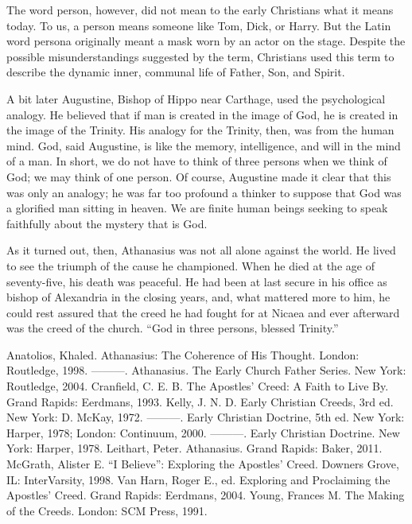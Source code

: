 The word person, however, did not mean to the early Christians what it means today. To us, a person
means someone like Tom, Dick, or Harry. But the Latin word persona originally meant a mask worn by
an actor on the stage. Despite the possible misunderstandings suggested by the term, Christians used
this term to describe the dynamic inner, communal life of Father, Son, and Spirit.

A bit later Augustine, Bishop of Hippo near Carthage, used the psychological analogy. He believed
that if man is created in the image of God, he is created in the image of the Trinity. His analogy
for the Trinity, then, was from the human mind. God, said Augustine, is like the memory,
intelligence, and will in the mind of a man. In short, we do not have to think of three persons when
we think of God; we may think of one person. Of course, Augustine made it clear that this was only
an analogy; he was far too profound a thinker to suppose that God was a glorified man sitting in
heaven. We are finite human beings seeking to speak faithfully about the mystery that is God.

As it turned out, then, Athanasius was not all alone against the world. He lived to see the triumph
of the cause he championed. When he died at the age of seventy-five, his death was peaceful. He had
been at last secure in his office as bishop of Alexandria in the closing years, and, what mattered
more to him, he could rest assured that the creed he had fought for at Nicaea and ever afterward was
the creed of the church. “God in three persons, blessed Trinity.”

\begin{readinglist}
\entry *Anatolios, Khaled. Athanasius: The Coherence of His Thought. London: Routledge, 1998.
\entry *———. Athanasius. The Early Church Father Series. New York: Routledge, 2004.
\entry Cranfield, C. E. B. The Apostles’ Creed: A Faith to Live By. Grand Rapids: Eerdmans, 1993.
\entry Kelly, J. N. D. Early Christian Creeds, 3rd ed. New York: D. McKay, 1972.
\entry ———. Early Christian Doctrine, 5th ed. New York: Harper, 1978; London: Continuum, 2000.
\entry ———. Early Christian Doctrine. New York: Harper, 1978.
\entry *Leithart, Peter. Athanasius. Grand Rapids: Baker, 2011.
\entry McGrath, Alister E. “I Believe”: Exploring the Apostles’ Creed. Downers Grove, IL:
  InterVarsity, 1998.
\entry Van Harn, Roger E., ed. Exploring and Proclaiming the Apostles’ Creed. Grand Rapids:
  Eerdmans, 2004.
\entry Young, Frances M. The Making of the Creeds. London: SCM Press, 1991.
\end{readinglist}
